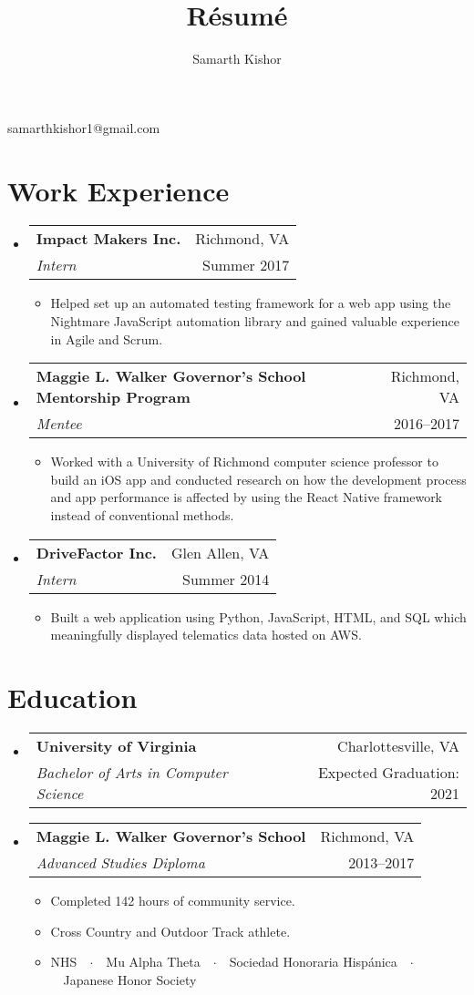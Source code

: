 \documentclass{article}
\makeatletter
\renewcommand{\maketitle}{
\begin{center}
{\huge\bfseries\theauthor}

\vspace{0.25em}

samarthkishor1@gmail.com

\end{center}}
\newcommand{\resumeSubHeadingListStart}{\begin{itemize}[leftmargin=*]}
\newcommand{\resumeSubHeadingListEnd}{\end{itemize}}
\newcommand{\workSubheading}[5]{
\item
\begin{tabular*}{\textwidth}{l@{\extracolsep{\fill}}r}
\textbf{\large#1} & {\small #2} \\
\textit{#3} & {#4}
\end{tabular*}
\vspace{-1em}
\begin{itemize}
\item #5
\end{itemize}
\vspace{0.25em}}
\newcommand{\eduSubheading}[4]{
\item
\begin{tabular*}{\textwidth}{l@{\extracolsep{\fill}}r}
\textbf{\large#1} & {\small #2} \\
\textit{#3} & {#4}
\end{tabular*}}
\makeatother
\begin{document}
\title{R\'esum\'e}
\author{Samarth Kishor}

\maketitle


\section{Work Experience}

\resumeSubHeadingListStart
\workSubheading{Impact Makers Inc.}{Richmond, VA}
{Intern}{Summer 2017}
{Helped set up an automated testing framework for a web app using the Nightmare JavaScript automation library and gained valuable experience in Agile and Scrum.}

\workSubheading{Maggie L. Walker Governor's School Mentorship Program}{Richmond, VA}
{Mentee}{2016--2017}
{Worked with a University of Richmond computer science professor to build an iOS app and conducted research on how the development process and app performance is affected by using the React Native framework instead of conventional methods.}

\workSubheading{DriveFactor Inc.}{Glen Allen, VA}
{Intern}{Summer 2014}
{Built a web application using Python, JavaScript, HTML, and SQL which meaningfully displayed telematics data hosted on AWS.}
\resumeSubHeadingListEnd


\vspace{-1.5em}
\section{Education}

\resumeSubHeadingListStart
\eduSubheading{University of Virginia}{Charlottesville, VA}
{Bachelor of Arts in Computer Science}{Expected Graduation: 2021}

\eduSubheading{Maggie L. Walker Governor's School}{Richmond, VA}
{Advanced Studies Diploma}{2013--2017}
\vspace{-1em}
\begin{itemize}
\item Completed 142 hours of community service.
\item Cross Country and Outdoor Track athlete.
\item NHS\ \ $\cdotp$\ \ Mu Alpha Theta\ \ $\cdotp$\ \ Sociedad Honoraria Hisp\'anica\ \ $\cdotp$\ \ Japanese Honor Society
\end{itemize}
\resumeSubHeadingListEnd
\end{document}

